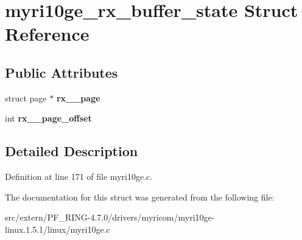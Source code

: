 \hypertarget{structmyri10ge__rx__buffer__state}{
\section{myri10ge\_\-rx\_\-buffer\_\-state Struct Reference}
\label{structmyri10ge__rx__buffer__state}
}
\subsection*{Public Attributes}
\begin{DoxyCompactItemize}
\item 
\hypertarget{structmyri10ge__rx__buffer__state_ad09a8f969aeaf3640b2206de247762be}{
struct page $\ast$ {\bfseries rx\_\-\_\-page}}
\label{structmyri10ge__rx__buffer__state_ad09a8f969aeaf3640b2206de247762be}

\item 
\hypertarget{structmyri10ge__rx__buffer__state_aae19b986500b2311b2b85a87ca3c79bc}{
int {\bfseries rx\_\-\_\-page\_\-offset}}
\label{structmyri10ge__rx__buffer__state_aae19b986500b2311b2b85a87ca3c79bc}

\end{DoxyCompactItemize}


\subsection{Detailed Description}


Definition at line 171 of file myri10ge.c.



The documentation for this struct was generated from the following file:\begin{DoxyCompactItemize}
\item 
src/extern/PF\_\-RING-\/4.7.0/drivers/myricom/myri10ge-\/linux.1.5.1/linux/myri10ge.c\end{DoxyCompactItemize}
